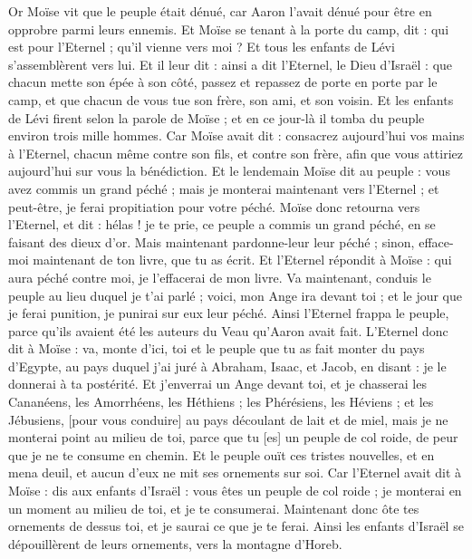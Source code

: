 \begin{multicols}{2}
Or Moïse vit que le peuple était dénué, car Aaron l'avait dénué pour être en opprobre parmi leurs ennemis.
Et Moïse se tenant à la porte du camp, dit : qui est pour l'Eternel ; qu'il vienne vers moi ? Et tous les enfants de Lévi s'assemblèrent vers lui.
Et il leur dit : ainsi a dit l'Eternel, le Dieu d'Israël : que chacun mette son épée à son côté, passez et repassez de porte en porte par le camp, et que chacun de vous tue son frère, son ami, et son voisin.
Et les enfants de Lévi firent selon la parole de Moïse ; et en ce jour-là il tomba du peuple environ trois mille hommes.
Car Moïse avait dit : consacrez aujourd'hui vos mains à l'Eternel, chacun même contre son fils, et contre son frère, afin que vous attiriez aujourd'hui sur vous la bénédiction.
Et le lendemain Moïse dit au peuple : vous avez commis un grand péché ; mais je monterai maintenant vers l'Eternel ; et peut-être, je ferai propitiation pour votre péché.
Moïse donc retourna vers l'Eternel, et dit : hélas ! je te prie, ce peuple a commis un grand péché, en se faisant des dieux d'or.
Mais maintenant pardonne-leur leur péché ; sinon, efface-moi maintenant de ton livre, que tu as écrit.
Et l'Eternel répondit à Moïse : qui aura péché contre moi, je l'effacerai de mon livre.
Va maintenant, conduis le peuple au lieu duquel je t'ai parlé ; voici, mon Ange ira devant toi ; et le jour que je ferai punition, je punirai sur eux leur péché.
Ainsi l'Eternel frappa le peuple, parce qu'ils avaient été les auteurs du Veau qu'Aaron avait fait.
\VerseOne{}L'Eternel donc dit à Moïse : va, monte d'ici, toi et le peuple que tu as fait monter du pays d'Egypte, au pays duquel j'ai juré à Abraham, Isaac, et Jacob, en disant : je le donnerai à ta postérité.
Et j'enverrai un Ange devant toi, et je chasserai les Cananéens, les Amorrhéens, les Héthiens ; les Phérésiens, les Héviens ; et les Jébusiens,
[pour vous conduire] au pays découlant de lait et de miel, mais je ne monterai point au milieu de toi, parce que tu [es] un peuple de col roide, de peur que je ne te consume en chemin.
Et le peuple ouït ces tristes nouvelles, et en mena deuil, et aucun d'eux ne mit ses ornements sur soi.
Car l'Eternel avait dit à Moïse : dis aux enfants d'Israël : vous êtes un peuple de col roide ; je monterai en un moment au milieu de toi, et je te consumerai. Maintenant donc ôte tes ornements de dessus toi, et je saurai ce que je te ferai.
Ainsi les enfants d'Israël se dépouillèrent de leurs ornements, vers la montagne d'Horeb.

\end{multicols}
